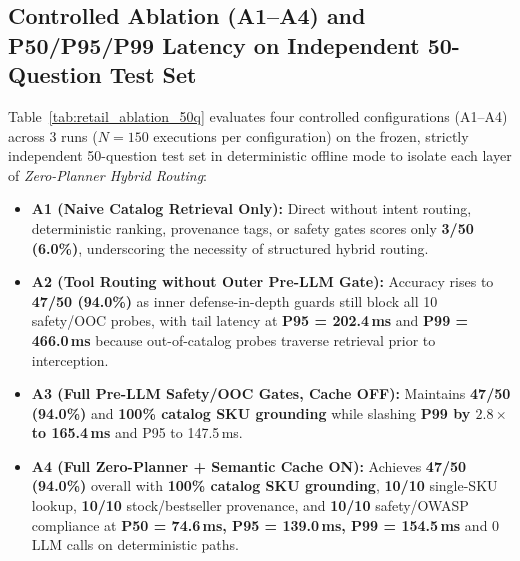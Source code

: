 \subsection*{Controlled Ablation (A1--A4) and P50/P95/P99 Latency on Independent 50-Question Test Set}
Table~\ref{tab:retail_ablation_50q} evaluates four controlled configurations (A1--A4) across 3 runs ($N=150$ executions per configuration) on the frozen, strictly independent 50-question test set in deterministic offline mode to isolate each layer of \emph{Zero-Planner Hybrid Routing}:
\begin{itemize}
    \item \textbf{A1 (Naive Catalog Retrieval Only):} Direct  without intent routing, deterministic ranking, provenance tags, or safety gates scores only \textbf{3/50 (6.0\%)}, underscoring the necessity of structured hybrid routing.
    \item \textbf{A2 (Tool Routing without Outer Pre-LLM Gate):} Accuracy rises to \textbf{47/50 (94.0\%)} as inner defense-in-depth guards still block all 10 safety/OOC probes, with tail latency at \textbf{P95 = 202.4\,ms} and \textbf{P99 = 466.0\,ms} because out-of-catalog probes traverse retrieval prior to interception.
    \item \textbf{A3 (Full Pre-LLM Safety/OOC Gates, Cache OFF):} Maintains \textbf{47/50 (94.0\%)} and \textbf{100\% catalog SKU grounding} while slashing \textbf{P99 by $2.8\times$ to 165.4\,ms} and P95 to 147.5\,ms.
    \item \textbf{A4 (Full Zero-Planner + Semantic Cache ON):} Achieves \textbf{47/50 (94.0\%)} overall with \textbf{100\% catalog SKU grounding}, \textbf{10/10} single-SKU lookup, \textbf{10/10} stock/bestseller provenance, and \textbf{10/10} safety/OWASP compliance at \textbf{P50 = 74.6\,ms, P95 = 139.0\,ms, P99 = 154.5\,ms} and 0 LLM calls on deterministic paths.
\end{itemize}

